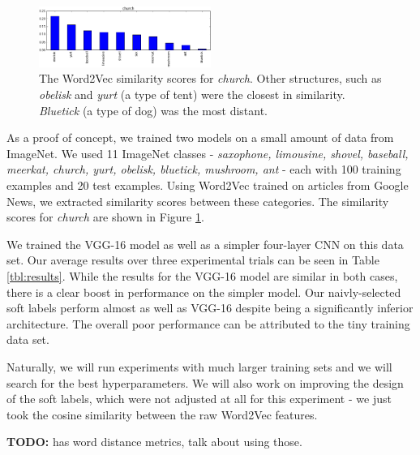 \begin{figure}[!tb]
  \centering
  \includegraphics[width=0.5\textwidth]{figs/word2vec_church.png}
  \caption{
    The Word2Vec similarity scores for \emph{church}. Other structures, such as
    \emph{obelisk} and \emph{yurt} (a type of tent) were the closest in
    similarity. \emph{Bluetick} (a type of dog) was the most distant.
  }
  \label{fig:word2vec_similarities}
\end{figure}

As a proof of concept, we trained two models on a small amount of data from
ImageNet. We used 11 ImageNet classes -
\emph{
  saxophone,
  limousine,
  shovel,
  baseball,
  meerkat,
  church,
  yurt,
  obelisk,
  bluetick,
  mushroom,
  ant
} -
each with 100 training examples and 20 test examples.
Using Word2Vec trained on articles from Google News, we extracted similarity
scores between these categories. The similarity scores for \emph{church} are
shown in Figure \ref{fig:word2vec_similarities}.

We trained the VGG-16 model as well as a simpler four-layer CNN on this data
set. Our average results over three experimental trials can be seen in Table
\ref{tbl:results}.
While the results for the VGG-16 model are similar in both cases, there is a
clear boost in performance on the simpler model. Our naivly-selected soft
labels perform almost as well as VGG-16 despite being a significantly inferior
architecture.
The overall poor performance can be attributed to the tiny training data set.

Naturally, we will run experiments with much larger training sets and we will
search for the best hyperparameters.
We will also work on improving the design of the soft labels, which were not
adjusted at all for this experiment - we just took the cosine similarity
between the raw Word2Vec features.



\textbf{TODO:} \cite{budanitsky2006evaluating} has word distance metrics, talk
about using those.


%
